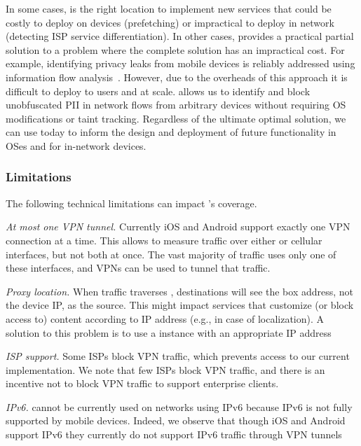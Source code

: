 In some cases, \meddle is the right location to implement new services that could be costly 
to deploy on devices (prefetching) or impractical to deploy in network (detecting ISP service differentiation). 
In other cases, \meddle provides a practical partial solution to a problem where the complete solution has an impractical 
cost. For example, identifying privacy leaks from mobile devices is reliably addressed using information flow 
analysis~\cite{enck:taintdroid}. However, due to the overheads of this approach it is difficult to deploy to users 
and at scale. \meddle allows us to identify and block unobfuscated PII in network flows from arbitrary devices without requiring 
OS modifications or taint tracking. Regardless of the ultimate optimal solution, we can use \meddle today to inform the design 
and deployment of future functionality in OSes and for in-network devices. 

\subsubsection{Limitations} The following technical limitations can impact \meddle's coverage.

\begin{packeditemize} 
\item\emph{At most one VPN tunnel.}
Currently iOS and Android support exactly one VPN connection at a time. 
This allows \meddle to measure traffic over either \wifi or cellular interfaces, but not both at once.
The vast majority of traffic uses only one of these interfaces, and VPNs can be used to tunnel that traffic.

\item\emph{Proxy location.} 
When traffic traverses \meddle, destinations will see the \meddle box address, not the device IP, as the source. 
This might impact services  that customize (or block access to) content according to IP address (e.g., in case of localization). 
A solution to this problem is to use a \meddle{} instance with an appropriate IP address

\item\emph{ISP support.}
Some ISPs block VPN traffic, which prevents access to our current \meddle implementation. 
We note that few ISPs block VPN traffic, and there is an incentive not to block VPN traffic to support enterprise clients.

\item\emph{IPv6.}
\meddle{} cannot be currently used on networks using IPv6 because IPv6 is not fully supported by mobile devices. 
Indeed, we observe that though iOS and Android support IPv6 they currently do not support IPv6 traffic through VPN tunnels
\end{packeditemize} 


